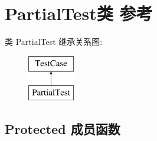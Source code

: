 \hypertarget{class_partial_test}{}\section{Partial\+Test类 参考}
\label{class_partial_test}
类 Partial\+Test 继承关系图\+:\begin{figure}[H]
\begin{center}
\leavevmode
\includegraphics[height=2.000000cm]{class_partial_test}
\end{center}
\end{figure}
\subsection*{Protected 成员函数}
